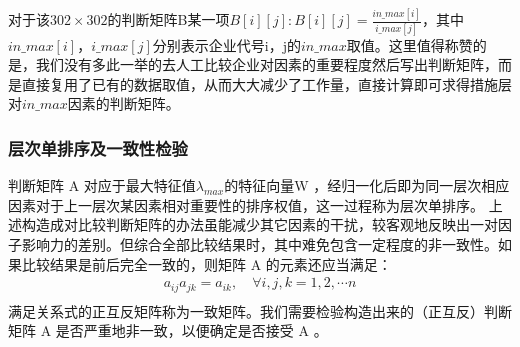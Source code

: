 \documentclass{cumcmthesis}
\begin{document}
对于该$302 \times 302$的判断矩阵B某一项$B[i][j]: B[i][j] = \frac{in\_max[i]}{i\_max[j]}$，其中$in\_max[i]$，$i\_max[j]$分别表示企业代号i，j的$in\_max$取值。这里值得称赞的是，我们没有多此一举的去人工比较企业对因素的重要程度然后写出判断矩阵，而是直接复用了已有的数据取值，从而大大减少了工作量，直接计算即可求得措施层对$in\_max$因素的判断矩阵。

\subsubsection{层次单排序及一致性检验}
判断矩阵 A 对应于最大特征值$λ_{max}$的特征向量W ，经归一化后即为同一层次相应因素对于上一层次某因素相对重要性的排序权值，这一过程称为层次单排序。
上述构造成对比较判断矩阵的办法虽能减少其它因素的干扰，较客观地反映出一对因子影响力的差别。但综合全部比较结果时，其中难免包含一定程度的非一致性。如果比较结果是前后完全一致的，则矩阵 A 的元素还应当满足：
\begin{equation}
    \begin{split}
        a_{ij}a_{jk} = a_{ik},  \quad  \forall i,j,k = 1,2,\cdots n \\
    \end{split}
\end{equation}
满足关系式的正互反矩阵称为一致矩阵。我们需要检验构造出来的（正互反）判断矩阵 A 是否严重地非一致，以便确定是否接受 A 。 
\end{document}
